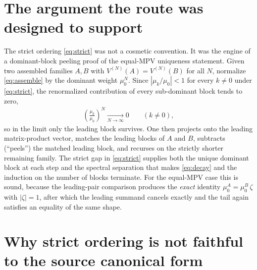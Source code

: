 \documentclass{article}
\begin{document}
\section{The argument the route was designed to support}

The strict ordering \eqref{eq:strict} was not a cosmetic convention. It was the
engine of a dominant-block peeling proof of the equal-MPV uniqueness statement.
Given two assembled families $A,B$ with $V^{(N)}(A)=V^{(N)}(B)$ for all $N$,
normalize \eqref{eq:assemble} by the dominant weight $\mu_0^N$. Since
$|\mu_k/\mu_0|<1$ for every $k\neq 0$ under \eqref{eq:strict}, the renormalized
contribution of every sub-dominant block tends to zero,
\begin{align}
    \left(\tfrac{\mu_k}{\mu_0}\right)^{\!N} \xrightarrow[N\to\infty]{} 0
    \qquad (k \neq 0),
    \label{eq:decay}
\end{align}
so in the limit only the leading block survives. One then projects onto the
leading matrix-product vector, matches the leading blocks of $A$ and $B$,
subtracts (``peels'') the matched leading block, and recurses on the strictly
shorter remaining family. The strict gap in \eqref{eq:strict} supplies both the
unique dominant block at each step and the spectral separation that makes
\eqref{eq:decay} and the induction on the number of blocks terminate. For the
equal-MPV case this is sound, because the leading-pair comparison produces the
\emph{exact} identity $\mu^A_0 = \mu^B_0\,\zeta$ with $|\zeta|=1$, after which the
leading summand cancels exactly and the tail again satisfies an equality of the
same shape.

\section{Why strict ordering is not faithful to the source canonical form}
\end{document}

